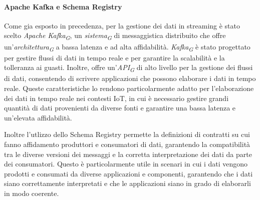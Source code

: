 \paragraph{Apache Kafka e Schema Registry}
Come gia esposto in precedenza, per la gestione dei dati in streaming è stato scelto \textit{Apache Kafka}\textsubscript{\textit{G}}, un \textit{sistema}\textsubscript{\textit{G}} di messaggistica distribuito che offre un'\textit{architettura}\textsubscript{\textit{G}} a bassa latenza e ad alta affidabilità. \textit{Kafka}\textsubscript{\textit{G}} è stato progettato per gestire flussi di dati in tempo reale e per garantire la scalabilità e la tolleranza ai guasti. Inoltre, offre un'\textit{API}\textsubscript{\textit{G}} di alto livello per la gestione dei flussi di dati, consentendo di scrivere applicazioni che possono elaborare i dati in tempo reale. Queste caratteristiche lo rendono particolarmente adatto per l'elaborazione dei dati in tempo reale nei contesti IoT, in cui è necessario gestire grandi quantità di dati provenienti da diverse fonti e garantire una bassa latenza e un'elevata affidabilità.

Inoltre l'utlizzo dello Schema Registry permette la definizioni di contratti su cui fanno affidamento produttori e consumatori di dati, garantendo la compatibilità tra le diverse versioni dei messaggi e la corretta interpretazione dei dati da parte dei consumatori. Questo è particolarmente utile in scenari in cui i dati vengono prodotti e consumati da diverse applicazioni e componenti, garantendo che i dati siano correttamente interpretati e che le applicazioni siano in grado di elaborarli in modo coerente.


